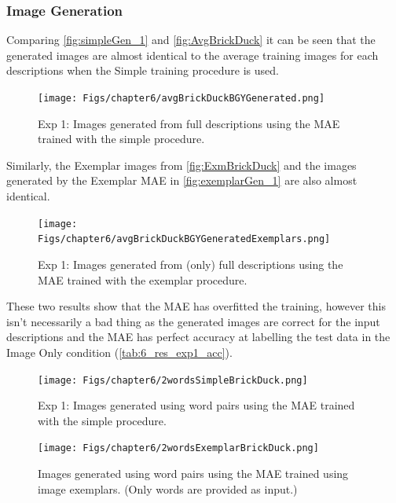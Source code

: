 \subsubsection{Image Generation}

Comparing \autoref{fig:simpleGen_1} and \autoref{fig:AvgBrickDuck} it can be seen that the generated images are almost identical to the average training images for each descriptions when the Simple training procedure is used. 

\begin{figure}[ht]
    \centering
    \texttt{[image: Figs/chapter6/avgBrickDuckBGYGenerated.png]}
    \caption{Exp 1: Images generated from full descriptions using the MAE trained with the simple procedure.}
    \label{fig:simpleGen_1}
\end{figure}

Similarly, the Exemplar images from \autoref{fig:ExmBrickDuck} and the images generated by the Exemplar MAE in \autoref{fig:exemplarGen_1} are also almost identical.

\begin{figure}[ht]
    \centering
    \texttt{[image: Figs/chapter6/avgBrickDuckBGYGeneratedExemplars.png]}
    \caption{Exp 1: Images generated from (only) full descriptions using the MAE trained with the exemplar procedure.}
    \label{fig:exemplarGen_1}
\end{figure}

These two results show that the MAE has overfitted the training, however this isn't necessarily a bad thing as the generated images are correct for the input descriptions and the MAE has perfect accuracy at labelling the test data in the Image Only condition (\autoref{tab:6_res_exp1_acc}).



\begin{figure}[ht]
    \centering
    \texttt{[image: Figs/chapter6/2wordsSimpleBrickDuck.png]}
    \caption{Exp 1: Images generated using word pairs using the MAE trained with the simple procedure.}
    \label{fig:2wordsSimpleBrickDuck}
\end{figure}

\begin{figure}[ht]
    \centering
    \texttt{[image: Figs/chapter6/2wordsExemplarBrickDuck.png]}
    \caption{Images generated using word pairs using the MAE trained using image exemplars. (Only words are provided as input.)}
    \label{fig:2wordsExemplarBrickDuck}
\end{figure}


